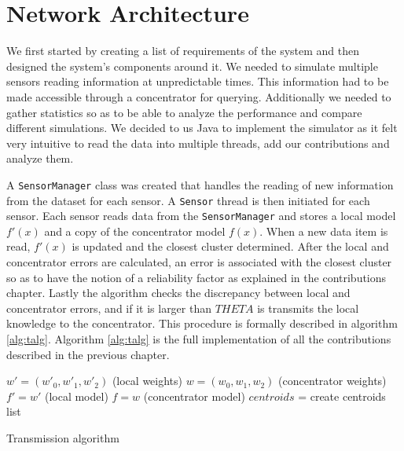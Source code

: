 \documentclass{mproj}
\begin{document}
\section{Network Architecture}
We first started by creating a list of requirements of the system and then designed the system's components around it. We needed to simulate multiple sensors reading information at unpredictable times. This information had to be made accessible through a concentrator for querying. Additionally we needed to gather statistics so as to be able to analyze the performance and compare different simulations. We decided to us Java to implement the simulator as it felt very intuitive to read the data into multiple threads, add our contributions and analyze them.

A \texttt{SensorManager} class was created that handles the reading of new information from the dataset for each sensor. A \texttt{Sensor} thread is then initiated for each sensor. Each sensor reads data from the \texttt{SensorManager} and stores a local model $f'(x)$ and a copy of the concentrator model $f(x)$. When a new data item is read, $f'(x)$ is updated and the closest cluster determined. After the local and concentrator errors are calculated, an error is associated with the closest cluster so as to have the notion of a reliability factor as explained in the contributions chapter. Lastly the algorithm checks the discrepancy between local and concentrator errors, and if it is larger than $THETA$ is transmits the local knowledge to the concentrator. This procedure is formally described in algorithm \ref{alg:talg}. Algorithm \ref{alg:talg} is the full implementation of all the contributions described in the previous chapter. 

\begin{algorithm}[H]
$w'=(w'_0,w'_1,w'_2)$ (local weights)\;
$w=(w_0,w_1,w_2)$ (concentrator weights)\;
$f' = w'$ (local model)\;
$f = w$ (concentrator model)\;
$centroids$ = create centroids list\;
 \caption{Transmission algorithm}
 \label{alg:talg}
\end{algorithm}
\end{document}
